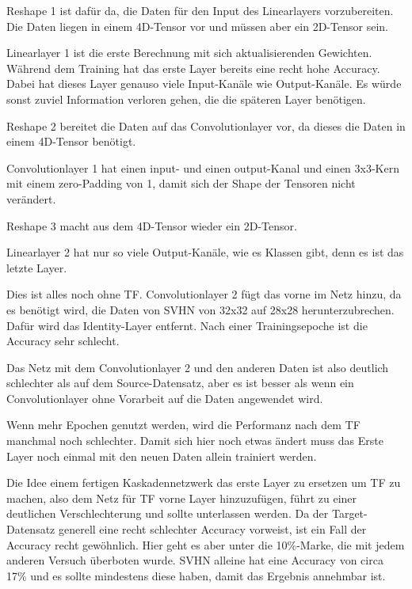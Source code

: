     Reshape 1 ist dafür da, die Daten für den Input des Linearlayers vorzubereiten. 
    Die Daten liegen in einem 4D-Tensor vor und müssen aber ein 2D-Tensor sein. 

    Linearlayer 1 ist die erste Berechnung mit sich aktualisierenden Gewichten. 
    Während dem Training hat das erste Layer bereits eine recht hohe Accuracy. 
    Dabei hat dieses Layer genauso viele Input-Kanäle wie Output-Kanäle. 
    Es würde sonst zuviel Information verloren gehen, die die späteren Layer benötigen.

    Reshape 2 bereitet die Daten auf das Convolutionlayer vor, da dieses die Daten 
    in einem 4D-Tensor benötigt.

    Convolutionlayer 1 hat einen input- und einen output-Kanal und einen 3x3-Kern 
    mit einem zero-Padding von 1, damit sich der Shape der Tensoren nicht verändert. 

    Reshape 3 macht aus dem 4D-Tensor wieder ein 2D-Tensor.

    Linearlayer 2 hat nur so viele Output-Kanäle, wie es Klassen gibt, denn es 
    ist das letzte Layer. 

    Dies ist alles noch ohne TF.
    Convolutionlayer 2 fügt das vorne im Netz hinzu, da es benötigt wird, die 
    Daten von SVHN von 32x32 auf 28x28 herunterzubrechen. Dafür wird das Identity-Layer 
    entfernt. Nach einer Trainingsepoche ist die Accuracy sehr schlecht.

    Das Netz mit dem Convolutionlayer 2 und den anderen Daten ist also deutlich schlechter 
    als auf dem Source-Datensatz, aber es ist besser als wenn ein Convolutionlayer ohne Vorarbeit 
    auf die Daten angewendet wird.

    Wenn mehr Epochen genutzt werden, wird die Performanz nach dem TF manchmal 
    noch schlechter. Damit sich hier noch etwas ändert muss das Erste Layer noch 
    einmal mit den neuen Daten allein trainiert werden.

    Die Idee einem fertigen Kaskadennetzwerk das erste Layer zu ersetzen um TF zu machen, also 
    dem Netz für TF vorne Layer hinzuzufügen, führt zu einer deutlichen Verschlechterung und sollte 
    unterlassen werden. Da der Target-Datensatz generell eine recht schlechter Accuracy 
    vorweist, ist ein Fall der Accuracy recht gewöhnlich. Hier geht es aber unter die 10\%-Marke, 
    die mit jedem anderen Versuch überboten wurde. SVHN alleine hat eine Accuracy von circa 17\% und 
    es sollte mindestens diese haben, damit das Ergebnis annehmbar ist.

